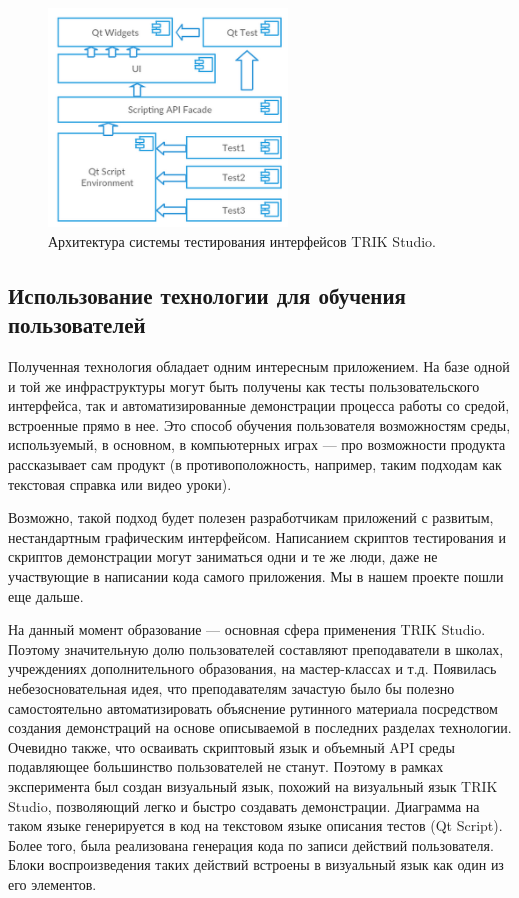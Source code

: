 \documentclass[conference]{IEEEtran}
\begin{document}
\begin{figure}[!t]
	\centering
	\includegraphics[width=2.5in]{guiTestingArchitecture.png}
	\caption{Архитектура системы тестирования интерфейсов TRIK Studio.}
	\label{image:architecture}
\end{figure}

\subsection{Использование технологии для обучения пользователей}
Полученная технология обладает одним интересным приложением. На базе одной и той же 
инфраструктуры могут быть получены как тесты пользовательского интерфейса, так и автоматизированные 
демонстрации процесса работы со средой, встроенные прямо в нее. Это способ обучения 
пользователя возможностям среды, используемый, в основном, в компьютерных играх --- про 
возможности продукта рассказывает сам продукт (в противоположность, например, таким 
подходам как текстовая справка или видео уроки).

Возможно, такой подход будет полезен разработчикам приложений с развитым, нестандартным 
графическим интерфейсом. Написанием скриптов тестирования и скриптов демонстрации 
могут заниматься одни и те же люди, даже не участвующие в написании кода самого приложения. 
Мы в нашем проекте пошли еще дальше.

На данный момент образование --- основная сфера применения TRIK Studio. Поэтому значительную 
долю пользователей составляют преподаватели в школах, учреждениях дополнительного образования, 
на мастер-классах и т.д. Появилась небезосновательная идея, что преподавателям зачастую 
было бы полезно самостоятельно автоматизировать объяснение рутинного материала посредством 
создания демонстраций на основе описываемой в последних разделах технологии. Очевидно 
также, что осваивать скриптовый язык и объемный API среды подавляющее большинство пользователей 
не станут. Поэтому в рамках эксперимента был создан визуальный язык, похожий на визуальный язык 
TRIK Studio, позволяющий легко и быстро создавать демонстрации. Диаграмма на таком 
языке генерируется в код на текстовом языке описания тестов (Qt Script). Более того, 
была реализована генерация кода по записи действий пользователя. Блоки воспроизведения 
таких действий встроены в визуальный язык как один из его элементов.
\end{document}
